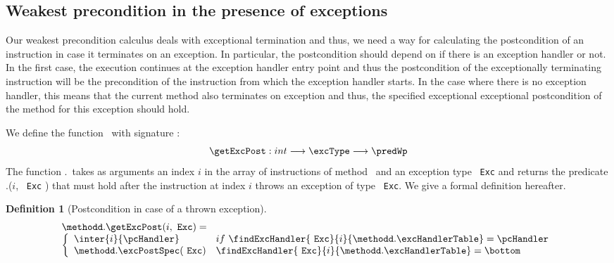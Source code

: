 \newtheorem{defExc}{Definition}[subsection]
\newtheorem{defExcRuntime}[defExc]{Definition}%
\subsection{Weakest precondition in the presence of exceptions } \label{wp:Exc} %
Our weakest precondition calculus deals with exceptional termination and thus, we need
a way for calculating the postcondition of an instruction in  case it terminates on an exception.
In particular, the postcondition should depend on if there is an exception handler or not. 
In the first case, the execution continues at the exception handler entry point and thus
 the postcondition of the exceptionally terminating instruction will be the precondition 
of the instruction from which the exception handler starts. In the case where there is no exception handler,
 this means that the current method also terminates on exception and thus, the specified exceptional exceptional
postcondition of the method for this exception should hold.

We define the function \getExcPost \  with signature :
 $$\getExcPost : int   \longrightarrow \excType \longrightarrow  \predWp  $$
The function \methodd.\getExcPost \ 
takes as arguments an index $i$ in the array of instructions of method \methodd \ and an exception type
 \mbox{ \rm \texttt{Exc}}  and returns the predicate \methodd.\getExcPost($i$, \mbox{ \rm \texttt{Exc}}   )
  that must hold after the instruction at index $i$ throws an exception of type \mbox{ \rm \texttt{Exc}}. We give a formal definition hereafter.


\begin{defExc}[Postcondition in case of a thrown exception]\label{defExc}
$$  \begin{array}{l}
           \methodd.\getExcPost(i, \mbox{ \rm \texttt{Exc}}   ) = \\
   \left\{\begin{array}{ll}
        \inter{i}{\pcHandler}   & if \  \findExcHandler{\mbox{ \rm \texttt{Exc}} }{i}{\methodd.\excHandlerTable} = \pcHandler \\
	\methodd.\excPostSpec( \mbox{ \rm \texttt{Exc}}  ) & \findExcHandler{\mbox{ \rm \texttt{Exc}} }{i}{\methodd.\excHandlerTable} = \bottom 
  \end{array}\right.
\end{array}
$$
\end{defExc}

